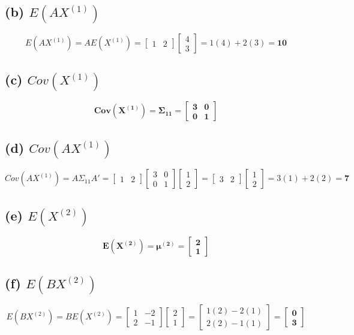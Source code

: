 \documentclass[11pt]{article}
\begin{document}
\subsection*{(b) $E(AX^{(1)})$}
\[
E(AX^{(1)}) = A E(X^{(1)}) = \begin{bmatrix} 1 & 2 \end{bmatrix} \begin{bmatrix} 4 \\ 3 \end{bmatrix} = 1(4) + 2(3) = \mathbf{10}
\]

\subsection*{(c) $Cov(X^{(1)})$}
\[
\mathbf{Cov(X^{(1)}) = \Sigma_{11} = \begin{bmatrix} 3 & 0 \\ 0 & 1 \end{bmatrix}}
\]

\subsection*{(d) $Cov(AX^{(1)})$}
\[
Cov(AX^{(1)}) = A \Sigma_{11} A' = \begin{bmatrix} 1 & 2 \end{bmatrix} \begin{bmatrix} 3 & 0 \\ 0 & 1 \end{bmatrix} \begin{bmatrix} 1 \\ 2 \end{bmatrix}
= \begin{bmatrix} 3 & 2 \end{bmatrix} \begin{bmatrix} 1 \\ 2 \end{bmatrix} = 3(1) + 2(2) = \mathbf{7}
\]

\subsection*{(e) $E(X^{(2)})$}
\[
\mathbf{E(X^{(2)}) = \mu^{(2)} = \begin{bmatrix} 2 \\ 1 \end{bmatrix}}
\]

\subsection*{(f) $E(BX^{(2)})$}
\[
E(BX^{(2)}) = B E(X^{(2)}) = \begin{bmatrix} 1 & -2 \\ 2 & -1 \end{bmatrix} \begin{bmatrix} 2 \\ 1 \end{bmatrix} 
= \begin{bmatrix} 1(2) - 2(1) \\ 2(2) - 1(1) \end{bmatrix} = \mathbf{\begin{bmatrix} 0 \\ 3 \end{bmatrix}}
\]
\end{document}
